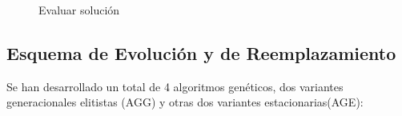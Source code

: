 \begin{figure}[H]
	\centering
	\begin{minipage}{.9\linewidth}
		
		
		
		\begin{algorithm}[H] 
			
			\caption{Evaluar solución}
			\SetAlgoLined
			
			
			
		\end{algorithm} 
		
	\end{minipage}
\end{figure}





\subsection{Esquema de Evolución y de Reemplazamiento}
Se han desarrollado un total de 4 algoritmos genéticos, dos variantes generacionales elitistas (AGG) y otras dos variantes estacionarias(AGE):

